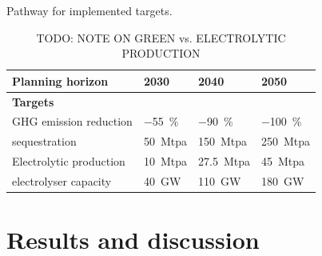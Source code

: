 \documentclass[preprint,12pt,sort&compress]{elsarticle}
\begin{document}
\begin{table}[htbp]
  \centering
  \caption{Pathway for implemented targets.}
  \label{tab:targets}
  \scriptsize
  \begin{tabularx}{\textwidth}{R{3.9cm}>{\centering\arraybackslash}X>{\centering\arraybackslash}X>{\centering\arraybackslash}X}
    \toprule
    \textbf{Planning horizon} & \textbf{2030} & \textbf{2040} & \textbf{2050} \\
    \midrule
    \textbf{Targets} & & & \\
    GHG emission reduction &  \SI{-55}{\percent} & \SI{-90}{\percent} & \SI{-100}{\percent} \\
     sequestration & \SI{50}{Mtpa} & \SI{150}{Mtpa} & \SI{250}{Mtpa} \\
    Electrolytic  production & \SI{10}{Mtpa} & \SI{27.5}{Mtpa} & \SI{45}{Mtpa} \\
     electrolyser capacity & \SI{40}{GW} &  \SI{110}{GW} &  \SI{180}{GW} \\
    \bottomrule
  \end{tabularx}
  \caption*{\scriptsize TODO: NOTE ON GREEN vs. ELECTROLYTIC  PRODUCTION}
\end{table}


\newpage
\section{Results and discussion}
\label{sec:results_and_discussion}
\end{document}
